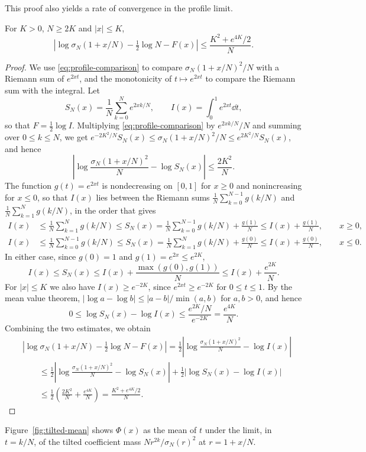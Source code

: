 This proof also yields a rate of convergence in the profile limit.

\begin{lemma}\label{lem:profile-rate}
For $K>0$, $N\ge2K$ and $|x|\le K$,
\[
 \left|\log\sigma_N(1+x/N)-\tfrac12\log N-F(x)\right|
 \le\frac{K^2+e^{4K}/2}{N}.
\]
\end{lemma}

\begin{proof}
We use \eqref{eq:profile-comparison} to compare
$\sigma_N(1+x/N)^2/N$ with a Riemann sum of $e^{2xt}$, and the
monotonicity of $t\mapsto e^{2xt}$ to compare the Riemann sum with the
integral.
Let
\[
 S_N(x)=\frac1N\sum_{k=0}^Ne^{2xk/N},\qquad
 I(x)=\int_0^1e^{2xt}\dd t,
\]
so that $F=\frac12\log I$.
Multiplying \eqref{eq:profile-comparison} by $e^{2xk/N}/N$ and summing
over $0\le k\le N$, we get
$e^{-2K^2/N}S_N(x)\le\sigma_N(1+x/N)^2/N\le e^{2K^2/N}S_N(x)$, and hence
\[
 \left|\log\frac{\sigma_N(1+x/N)^2}N-\log S_N(x)\right|\le\frac{2K^2}N.
\]
The function $g(t)=e^{2xt}$ is nondecreasing on $[0,1]$ for $x\ge0$ and
nonincreasing for $x\le0$, so that $I(x)$ lies between the Riemann sums
$\frac1N\sum_{k=0}^{N-1}g(k/N)$ and $\frac1N\sum_{k=1}^Ng(k/N)$, in the
order that gives
\begin{align*}
 I(x)&\le\frac1N\sum_{k=1}^Ng(k/N)\le S_N(x)
 =\frac1N\sum_{k=0}^{N-1}g(k/N)+\frac{g(1)}N\le I(x)+\frac{g(1)}N,
 \qquad x\ge0,\\
 I(x)&\le\frac1N\sum_{k=0}^{N-1}g(k/N)\le S_N(x)
 =\frac1N\sum_{k=1}^Ng(k/N)+\frac{g(0)}N\le I(x)+\frac{g(0)}N,
 \qquad x\le0.
\end{align*}
In either case, since $g(0)=1$ and $g(1)=e^{2x}\le e^{2K}$,
\[
 I(x)\le S_N(x)\le I(x)+\frac{\max(g(0),g(1))}N\le I(x)+\frac{e^{2K}}N.
\]
For $|x|\le K$ we also have $I(x)\ge e^{-2K}$, since $e^{2xt}\ge e^{-2K}$
for $0\le t\le1$.
By the mean value theorem, $|\log a-\log b|\le|a-b|/\min(a,b)$ for
$a,b>0$, and hence
\[
 0\le\log S_N(x)-\log I(x)\le\frac{e^{2K}/N}{e^{-2K}}=\frac{e^{4K}}N.
\]
Combining the two estimates, we obtain
\begin{align*}
 &\left|\log\sigma_N(1+x/N)-\tfrac12\log N-F(x)\right|
 =\tfrac12\left|\log\frac{\sigma_N(1+x/N)^2}N-\log I(x)\right|\\
 &\qquad\le\tfrac12\left|\log\frac{\sigma_N(1+x/N)^2}N-\log S_N(x)\right|
   +\tfrac12\bigl|\log S_N(x)-\log I(x)\bigr|\\
 &\qquad\le\tfrac12\left(\frac{2K^2}N+\frac{e^{4K}}N\right)
 =\frac{K^2+e^{4K}/2}{N}.
\end{align*}
\end{proof}

Figure~\ref{fig:tilted-mean} shows $\Phi(x)$ as the mean of $t$ under
the limit, in $t=k/N$, of the tilted coefficient mass
$Nr^{2k}/\sigma_N(r)^2$ at $r=1+x/N$.

\afterpage{}
